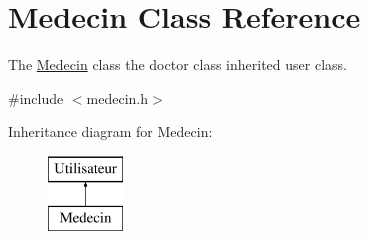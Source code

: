 \hypertarget{class_medecin}{}\section{Medecin Class Reference}
\label{class_medecin}


The \mbox{\hyperlink{class_medecin}{Medecin}} class the doctor class inherited user class.  




{\ttfamily \#include $<$medecin.\+h$>$}

Inheritance diagram for Medecin\+:\begin{figure}[H]
\begin{center}
\leavevmode
\includegraphics[height=2.000000cm]{class_medecin}
\end{center}
\end{figure}
